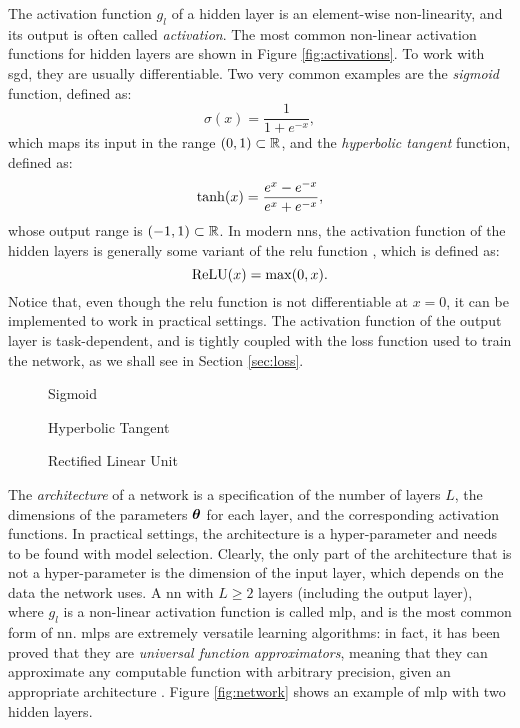 The activation function $g_l$ of a hidden layer is an element-wise non-linearity, and its output is often called \emph{activation}. The most common non-linear activation functions for hidden layers are shown in Figure \ref{fig:activations}. To work with \gls{sgd}, they are usually differentiable. Two very common examples are the \emph{sigmoid} function, defined as:
$$\sigma(x) = \frac{1}{1 + e^{-x}},$$
which maps its input in the range $(0, 1) \subset \mathbb{R}$, and the \emph{hyperbolic tangent} function, defined as:
$$\mathrm{tanh}(x) = \frac{e^x - e^{-x}}{e^x + e^{-x}},$$
whose output range is $(-1, 1) \subset \mathbb{R}$. In modern \glspl{nn}, the activation function of the hidden layers is generally some variant of the \gls{relu} function \citep{glorot2011relu}, which is defined as:
$$\mathrm{ReLU}(x) = \max(0, x).$$
Notice that, even though the \gls{relu} function is not differentiable at $x = 0$, it can be implemented to work in practical settings. The activation function of the output layer is task-dependent, and is tightly coupled with the loss function used to train the network, as we shall see in Section \ref{sec:loss}.
\begin{figure*}[h!]
    \begin{subfigure}[b]{0.32\linewidth}
        \centering
        \resizebox{.8\textwidth}{!}{}
        \caption{Sigmoid}
        \label{fig:sigmoid}
    \end{subfigure}
    \begin{subfigure}[b]{0.32\linewidth}
        \centering
        \resizebox{.8\textwidth}{!}{}
        \caption{Hyperbolic Tangent}
        \label{fig:hyptan}
    \end{subfigure}
    \begin{subfigure}[b]{0.32\linewidth}
        \centering
        \resizebox{.8\textwidth}{!}{}
        \caption{Rectified Linear Unit}
        \label{fig:relu}
    \end{subfigure}
    \caption{Examples of activation functions for the hidden layers (solid line) and their derivatives (dashed line).}
    \label{fig:activations}
\end{figure*}
The \emph{architecture} of a network is a specification of the number of layers $L$, the dimensions of the parameters $\boldsymbol{\theta}$ for each layer, and the corresponding activation functions. In practical settings, the architecture is a hyper-parameter and needs to be found with model selection. Clearly, the only part of the architecture that is not a hyper-parameter is the dimension of the input layer, which depends on the data the network uses. A \gls{nn} with $L \geq 2$ layers (including the output layer), where $g_{l}$ is a non-linear activation function is called \gls{mlp}, and is the most common form of \gls{nn}. \glspl{mlp} are extremely versatile learning algorithms: in fact, it has been proved that they are \emph{universal function approximators}, meaning that they can approximate any computable function with arbitrary precision, given an appropriate architecture \citep{cybenko1998approximationuniversal}. Figure \ref{fig:network} shows an example of \gls{mlp} with two hidden layers.

